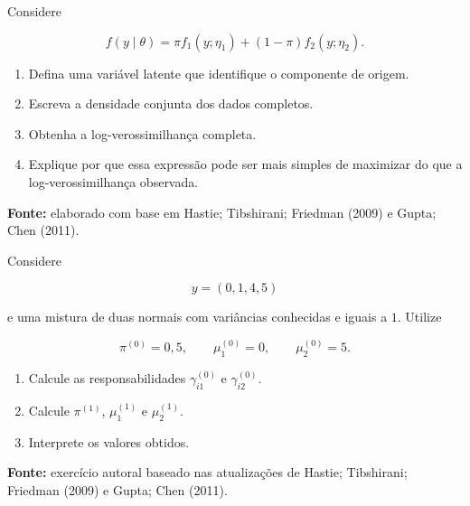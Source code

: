 \documentclass[
  letterpaper,
  DIV=11,
  numbers=noendperiod]{scrreprt}
\providecommand{\tightlist}{%
  \setlength{\itemsep}{0pt}\setlength{\parskip}{0pt}}\usepackage{longtable,booktabs,array}
\begin{document}
\begin{tcolorbox}[enhanced jigsaw, colback=white, leftrule=.75mm, colbacktitle=quarto-callout-note-color!10!white, breakable, titlerule=0mm, bottomtitle=1mm, title=\textcolor{quarto-callout-note-color}{\faInfo}\hspace{0.5em}{Exercício 1 --- dados observados e dados completos}, colframe=quarto-callout-note-color-frame, toprule=.15mm, opacityback=0, bottomrule=.15mm, opacitybacktitle=0.6, arc=.35mm, toptitle=1mm, rightrule=.15mm, coltitle=black, left=2mm]

Considere

\[f(y\mid\theta)
=
\pi f_1(y;\eta_1)
+
(1-\pi)f_2(y;\eta_2).\]

\begin{enumerate}
\def\labelenumi{\arabic{enumi}.}
\tightlist
\item
  Defina uma variável latente que identifique o componente de origem.
\item
  Escreva a densidade conjunta dos dados completos.
\item
  Obtenha a log-verossimilhança completa.
\item
  Explique por que essa expressão pode ser mais simples de maximizar do
  que a log-verossimilhança observada.
\end{enumerate}

\textbf{Fonte:} elaborado com base em Hastie; Tibshirani; Friedman
(2009) e Gupta; Chen (2011).

\end{tcolorbox}

\begin{tcolorbox}[enhanced jigsaw, colback=white, leftrule=.75mm, colbacktitle=quarto-callout-note-color!10!white, breakable, titlerule=0mm, bottomtitle=1mm, title=\textcolor{quarto-callout-note-color}{\faInfo}\hspace{0.5em}{Exercício 2 --- uma iteração para mistura normal}, colframe=quarto-callout-note-color-frame, toprule=.15mm, opacityback=0, bottomrule=.15mm, opacitybacktitle=0.6, arc=.35mm, toptitle=1mm, rightrule=.15mm, coltitle=black, left=2mm]

Considere

\[y=(0,1,4,5)\]

e uma mistura de duas normais com variâncias conhecidas e iguais a
\(1\). Utilize

\[\pi^{(0)}=0{,}5,
\qquad
\mu_1^{(0)}=0,
\qquad
\mu_2^{(0)}=5.\]

\begin{enumerate}
\def\labelenumi{\arabic{enumi}.}
\tightlist
\item
  Calcule as responsabilidades \(\gamma_{i1}^{(0)}\) e
  \(\gamma_{i2}^{(0)}\).
\item
  Calcule \(\pi^{(1)}\), \(\mu_1^{(1)}\) e \(\mu_2^{(1)}\).
\item
  Interprete os valores obtidos.
\end{enumerate}

\textbf{Fonte:} exercício autoral baseado nas atualizações de Hastie;
Tibshirani; Friedman (2009) e Gupta; Chen (2011).

\end{tcolorbox}
\end{document}
